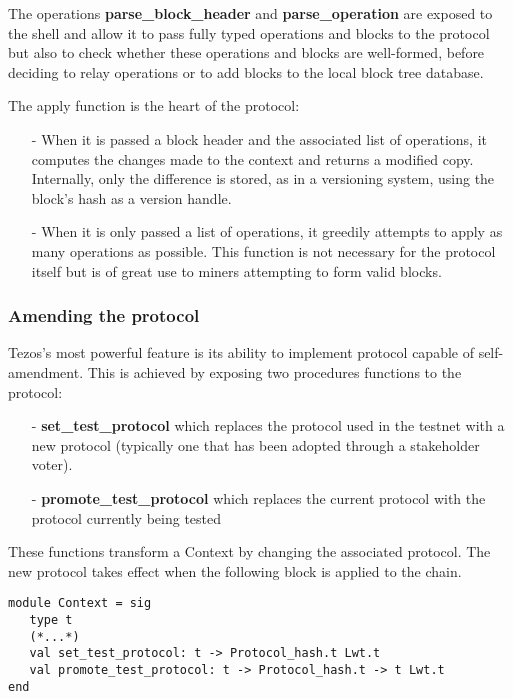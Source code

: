 \documentclass[letterpaper]{article}
\begin{document}
The operations \textbf{parse\_block\_header} and \textbf{parse\_operation} are
exposed to the  shell and allow it to pass fully typed operations and blocks to
the protocol but also to check whether these operations and blocks are
well-formed, before deciding to relay operations or to add blocks to the local
block tree database.

The apply function is the heart of the protocol:
\begin{itemize}
\item[-]When it is passed a block header and the associated list of operations,
it computes the changes made to the context and returns a modified copy.
Internally, only the difference is stored, as in a versioning system,
using the block's hash as a version handle.
\item[-]When it is only passed a list of operations, it greedily attempts
to apply as many operations as possible. This function is not necessary for the
protocol itself but is of great use to miners attempting to form valid blocks.
\end{itemize}

\subsubsection{Amending the protocol}

Tezos's most powerful feature is its ability to implement protocol capable
of self-amendment. This is achieved by exposing two procedures functions to the
protocol:

\begin{itemize}
\item[-] \textbf{set\_test\_protocol} which replaces the protocol
used in the testnet with a new protocol (typically one that has been adopted
through a stakeholder voter).
\item[-] \textbf{promote\_test\_protocol} which replaces the current
protocol with the protocol currently being tested
\end{itemize}

These functions transform a Context by changing the associated protocol.
The new protocol takes effect when the following block is applied to the chain.

\begin{lstlisting}
module Context = sig
   type t
   (*...*)
   val set_test_protocol: t -> Protocol_hash.t Lwt.t
   val promote_test_protocol: t -> Protocol_hash.t -> t Lwt.t
end
\end{lstlisting}
\end{document}
